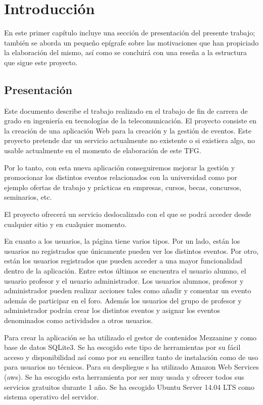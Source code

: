 \chapter{Introducción}
\label{sec:intro}

En este primer capítulo incluye una sección de presentación del presente trabajo; también se aborda un pequeño epígrafe sobre las motivaciones que han propiciado la elaboración del mismo, así como se concluirá con una reseña a la estructura que sigue este proyecto.


\section{Presentación}

Este documento describe el trabajo realizado en el trabajo de fin de carrera de grado en ingeniería en tecnologías de la telecomunicación. El proyecto consiste en la creación de una aplicación Web para la creación y la gestión de eventos. Este proyecto pretende dar un servicio actualmente no existente o si existiera algo, no usable actualmente en el momento de elaboración de este TFG.


Por lo tanto, con esta nueva aplicación conseguiremos mejorar la gestión y promocionar los distintos eventos relacionados con la universidad como por ejemplo ofertas de trabajo y prácticas en empresas, cursos, becas, concursos, seminarios, etc.


El proyecto ofrecerá un servicio deslocalizado con el que se podrá acceder desde cualquier sitio y en cualquier  momento. 


En cuanto a los usuarios, la página tiene varios tipos. Por un lado, están los usuarios no registrados que únicamente pueden ver los distintos eventos. Por otro, están los usuarios registrados que pueden acceder a una mayor funcionalidad dentro de la aplicación. Entre estos últimos se encuentra el usuario alumno, el usuario profesor y el usuario administrador. Los usuarios alumnos, profesor y administrador pueden realizar acciones tales como añadir y comentar un evento además de participar en el foro. Además los usuarios del grupo de profesor y administrador podrán crear los distintos eventos y asignar los eventos denominados como actividades a otros usuarios.


Para crear la aplicación se ha utilizado el gestor de contenidos Mezzanine y como base de datos SQLite3. Se ha escogido este tipo de herramientas por su fácil acceso y disponibilidad así como por su sencillez tanto de instalación como de uso para usuarios no técnicos.
Para su despliegue s ha utilizado Amazon Web Services (aws). Se ha escogido esta herramienta por ser muy usada y ofrecer todos sus servicios gratuitos durante 1 año. Se ha escogido Ubuntu Server 14.04 LTS como sistema operativo del servidor.


